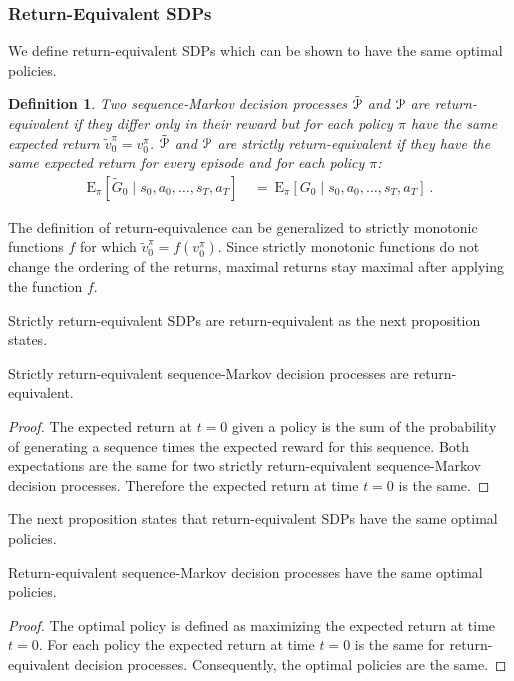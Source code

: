 \documentclass{article}
\newtheorem{definitionA}{Definition}
\newcommand\EXP{\mathbf{\mathrm{E}}}
\begin{document}
\begin{appendices}
\subsubsection{Return-Equivalent SDPs}
\label{sec:AEquiSDPs}

We define return-equivalent SDPs which can be shown to
have the same optimal policies.
\begin{definitionA}
  \label{def:AreturnEqSDP}
  Two sequence-Markov decision processes $\tilde{\mathcal{P}}$ and $\mathcal{P}$
  are {\em return-equivalent} if
  they differ only in their reward but
  for each policy $\pi$ have the same expected return
  $\tilde{v}^{\pi}_0=v^{\pi}_0$.
  $\tilde{\mathcal{P}}$ and $\mathcal{P}$ 
  are {\em strictly return-equivalent} if
  they have the same expected return for every episode and
  for each policy $\pi$:
  \begin{align}
   \EXP_{\pi} \left[
    \tilde{G}_0 \mid s_0,a_0,\ldots,s_T,a_T \right] \ &= \
   \EXP_{\pi} \left[
    G_0 \mid s_0,a_0,\ldots,s_T, a_T\right] \ .
  \end{align}
\end{definitionA}
The definition of return-equivalence can be generalized to 
strictly monotonic functions $f$
for which $\tilde{v}^{\pi}_0=f(v^{\pi}_0)$. Since strictly monotonic functions
do not change the ordering of the returns, maximal returns stay
maximal after applying the function $f$.

Strictly return-equivalent SDPs are return-equivalent as the
next proposition states.
\begin{propositionA}
\label{th:AstrictToEqsdp}
  Strictly return-equivalent sequence-Markov decision processes
  are return-equivalent.
\end{propositionA}
\begin{proof}
 The expected return at $t=0$ given a policy
  is the sum of
  the probability of generating a sequence times the expected reward
  for this sequence. Both expectations are the same for 
  two strictly return-equivalent sequence-Markov decision processes.
 Therefore the expected return at time $t=0$ is the same.
\end{proof}

The next proposition states that return-equivalent SDPs  
have the same optimal policies.
\begin{propositionA}
\label{th:AsdpPol}
  Return-equivalent sequence-Markov decision processes 
  have the same optimal policies.
\end{propositionA}
\begin{proof}
  The optimal policy is defined as maximizing the expected return at
  time $t=0$. 
  For each policy the 
  expected return at
  time $t=0$ is the same for return-equivalent decision processes.
  Consequently, the optimal policies are the same.
\end{proof}


\end{appendices}
\end{document}
